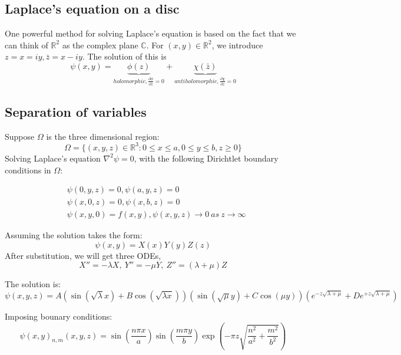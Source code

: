 \documentclass{article}
\theoremstyle{definition}
\begin{document}
\subsection{Laplace's equation on a disc}
One powerful method for solving Laplace's equation is based on the fact that we can think of $\mathbb{R}^2$ as the complex plane $\mathbb{C}$. For $(x,y)\in \mathbb{R}^2$, we introduce $z=x=iy,\bar{z}=x-iy$. The solution of this is 
\begin{equation}
\psi(x,y)=\underbrace{\phi(z)}_{holomorphic, \frac{\partial \phi}{\partial \bar{z}}=0}+\underbrace{\chi(\bar{z})}_{antiholomorphic, \frac{\partial \chi}{\partial z}=0}
\end{equation}
\subsection{Separation of variables}
Suppose $\Omega$ is the three dimensional region:
\begin{equation}
\Omega=\{(x,y,z)\in \mathbb{R}^3:0\leq x \leq a, 0 \leq y \leq b, z \geq 0\}
\end{equation}
Solving Laplace's equation $\nabla ^2\psi=0$, with the following Dirichtlet boundary conditions in $\Omega$:

\begin{align}
&\psi(0,y,z)=0,\psi(a,y,z)=0\\
&\psi(x,0,z)=0, \psi(x,b,z)=0\\
&\psi(x,y,0)=f(x,y),\psi(x,y,z)\to 0 \ as \ z\to \infty
\end{align}

Assuming the solution takes the form:
\begin{equation}
\psi(x,y)=X(x)Y(y)Z(z)
\end{equation}
After substitution, we will get three ODEs,
\begin{equation}
X''=-\lambda X, \ Y''=-\mu Y, \ Z''=(\lambda+\mu)Z 
\end{equation}

The solution is:
\begin{equation}
\psi(x,y,z)=A(\sin(\sqrt{\lambda}x)+B\cos(\sqrt{\lambda x}))(\sin(\sqrt{\mu}y)+C\cos(\mu y))(e^{-z\sqrt{\lambda+\mu}}+De^{+z\sqrt{\lambda+\mu}})
\end{equation}

Imposing bounary conditions:
\begin{equation}
\psi(x,y)_{n,m}(x,y,z)=\sin\left(\frac{n\pi x}{a}\right)\sin \left(\frac{m\pi y}{b}\right)\exp\left(-\pi z \sqrt{\frac{n^2}{a^2}+\frac{m^2}{b^2}}\right)
\end{equation}
\end{document}
